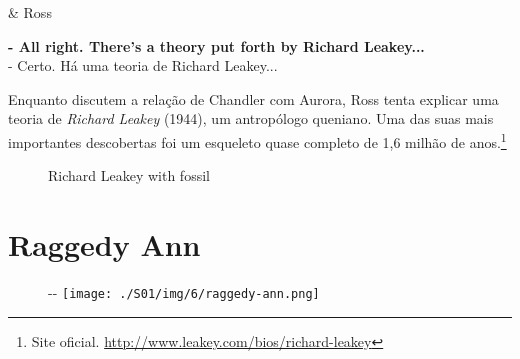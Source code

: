 \begin{tcolorbox}[enhanced,center upper,
    drop fuzzy shadow southeast, boxrule=0.3pt,
    lower separated=false, breakable,
    colframe=black!30!dialogoBorder,colback=white]
\begin{minipage}[c]{0.16\linewidth}
   & \centering \scriptsize{Ross}
\end{minipage}
\hfill
\begin{minipage}[c]{0.8\linewidth}
  \textbf{- All right. There's a theory put forth by Richard Leakey...}\\
  - Certo. Há uma teoria de Richard Leakey...
\end{minipage}
\end{tcolorbox}

Enquanto discutem a relação de Chandler com Aurora, Ross tenta explicar
uma teoria de \emph{Richard Leakey} (1944), um antropólogo queniano. Uma
das suas mais importantes descobertas foi um esqueleto quase completo de
1,6 milhão de anos.\footnote{\sloppy Site oficial. \url{http://www.leakey.com/bios/richard-leakey}}

\begin{figure}
  \centering
    \caption{Richard Leakey with fossil\label{fig:richard-leakey-with-fossil}}
\end{figure}

\hypertarget{raggedy-ann}{%
\section{Raggedy Ann}\label{raggedy-ann}}

\begin{figure}[!ht]
  \begin{adjustwidth}{-\oddsidemargin-1in}{-\rightmargin}
    \centering
    \texttt{[image: ./S01/img/6/raggedy-ann.png]}
  \end{adjustwidth}
\end{figure}

